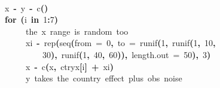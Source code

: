 \documentclass[a4paper]{article}
\newcommand{\hlnumber}[1]{\textcolor[rgb]{0.0823529411764706,0.0784313725490196,0.709803921568627}{#1}}%
\newcommand{\hlfunctioncall}[1]{\textcolor[rgb]{1,0,0}{#1}}%
\newcommand{\hlkeyword}[1]{\textcolor[rgb]{0,0,0}{\textbf{#1}}}%
\newcommand{\hlargument}[1]{\textcolor[rgb]{0.694117647058824,0.247058823529412,0.0196078431372549}{#1}}%
\newcommand{\hlcomment}[1]{\textcolor[rgb]{0.8,0.8,0.8}{#1}}%
\newcommand{\hlassignement}[1]{\textcolor[rgb]{0.215686274509804,0.215686274509804,0.384313725490196}{\textbf{#1}}}%
\newcommand{\hlsymbol}[1]{\textcolor[rgb]{0,0,0}{#1}}%
\newcommand{\hlprompt}[1]{\textcolor[rgb]{0,0,0}{#1}}%
\newcommand{\hlstd}[1]{\textcolor[rgb]{0,0,0}{#1}}%
\newenvironment{Houtput}{\raggedright}{%
%
}
\begin{document}
\begin{Houtput}
\normalfont
\hspace*{\fill}\\
\hlstd{}\ttfamily\noindent
\hlprompt{\usebox{\hlnormalsizeboxgreaterthan}{\ }}\hlsymbol{x}{\ }\hlassignement{\usebox{\hlnormalsizeboxlessthan}-}{\ }\hlsymbol{y}{\ }\hlassignement{\usebox{\hlnormalsizeboxlessthan}-}{\ }\hlfunctioncall{c}\hlkeyword{(}\hlkeyword{)}\mbox{}
\normalfont
\hspace*{\fill}\\
\hlstd{}\ttfamily\noindent
\hlprompt{\usebox{\hlnormalsizeboxgreaterthan}{\ }}\hlkeyword{for}{\ }\hlkeyword{(}\hlsymbol{i}{\ }\hlkeyword{in}{\ }\hlnumber{1}\hlkeyword{:}\hlnumber{7}\hlkeyword{)}{\ }\hlkeyword{\usebox{\hlnormalsizeboxopenbrace}}\hspace*{\fill}\\
\hlstd{}\hlprompt{{\ }}{\ }{\ }{\ }{\ }\hlcomment{\usebox{\hlnormalsizeboxhash}{\ }the{\ }x{\ }range{\ }is{\ }random{\ }too}\hspace*{\fill}\\
\hlstd{}\hlprompt{{\ }}{\ }{\ }{\ }{\ }\hlsymbol{xi}{\ }\hlassignement{\usebox{\hlnormalsizeboxlessthan}-}{\ }\hlfunctioncall{rep}\hlkeyword{(}\hlfunctioncall{seq}\hlkeyword{(}\hlargument{from}{\ }\hlargument{=}{\ }\hlnumber{0}\hlkeyword{,}{\ }\hlargument{to}{\ }\hlargument{=}{\ }\hlfunctioncall{runif}\hlkeyword{(}\hlnumber{1}\hlkeyword{,}{\ }\hlfunctioncall{runif}\hlkeyword{(}\hlnumber{1}\hlkeyword{,}{\ }\hlnumber{10}\hlkeyword{,}\hspace*{\fill}\\
\hlstd{}\hlprompt{{\ }}{\ }{\ }{\ }{\ }{\ }{\ }{\ }{\ }\hlnumber{30}\hlkeyword{)}\hlkeyword{,}{\ }\hlfunctioncall{runif}\hlkeyword{(}\hlnumber{1}\hlkeyword{,}{\ }\hlnumber{40}\hlkeyword{,}{\ }\hlnumber{60}\hlkeyword{)}\hlkeyword{)}\hlkeyword{,}{\ }\hlargument{length.out}{\ }\hlargument{=}{\ }\hlnumber{50}\hlkeyword{)}\hlkeyword{,}{\ }\hlnumber{3}\hlkeyword{)}\hspace*{\fill}\\
\hlstd{}\hlprompt{{\ }}{\ }{\ }{\ }{\ }\hlsymbol{x}{\ }\hlassignement{\usebox{\hlnormalsizeboxlessthan}-}{\ }\hlfunctioncall{c}\hlkeyword{(}\hlsymbol{x}\hlkeyword{,}{\ }\hlsymbol{ctry\usebox{\hlnormalsizeboxunderscore}x}\hlkeyword{[}\hlsymbol{i}\hlkeyword{]}{\ }\hlkeyword{+}{\ }\hlsymbol{xi}\hlkeyword{)}\hspace*{\fill}\\
\hlstd{}\hlprompt{{\ }}{\ }{\ }{\ }{\ }\hlcomment{\usebox{\hlnormalsizeboxhash}{\ }y{\ }takes{\ }the{\ }country{\ }effect{\ }plus{\ }obs{\ }noise}\hspace*{\fill}\\

\end{Houtput}
\end{document}
